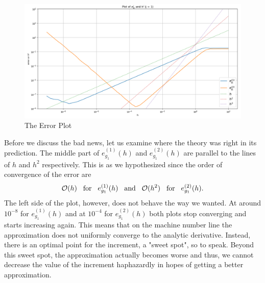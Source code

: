 \begin{figure}[h!]
    \includegraphics[width=\linewidth]{graphics/error_plot/exp1_error_plot.png}
    \caption{The Error Plot}
    \label{fig:exp1_error_plot}
\end{figure}

Before we discuss the bad news, let us examine where the theory was right in its prediction. The middle part of \(e_{g_1}^{(1)}(h)\) and \(e_{g_1}^{(2)}(h)\) are parallel to the lines of \(h\) and \(h^2\) respectively. This is as we hypothesized since the order of convergence of the error are
\[\mathcal{O}(h) \hspace{0.3cm} \text{for} \hspace{0.3cm} e_{g_1}^{(1)}(h) \hspace{0.3cm} \text{and} \hspace{0.3cm} \mathcal{O}(h^2) \hspace{0.3cm} \text{for} \hspace{0.3cm} e_{g_1}^{(2)}(h) \text{.}\]
The left side of the plot, however, does not behave the way we wanted. At around \(10^{-8}\) for \(e_{g_1}^{(1)}(h)\) and at \(10^{-4}\) for \(e_{g_1}^{(2)}(h)\) both plots stop converging and starts increasing again. This means that on the machine number line the approximation does not uniformly converge to the analytic derivative. Instead, there is an optimal point for the increment, a "sweet spot", so to speak. Beyond this sweet spot, the approximation actually becomes worse and thus, we cannot decrease the value of the increment haphazardly in hopes of getting a better approximation.

